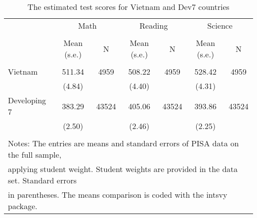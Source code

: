 \documentclass[10pt]{article}
\begin{document}
	\begin{table}[htbp]
		\footnotesize
		\def\arraystretch{0.9}
		\centering
		\caption{The estimated test scores for Vietnam and Dev7 countries}
		\begin{tabular}{lcccccc}
    \toprule
    \midrule
          & \multicolumn{2}{c}{Math} & \multicolumn{2}{c}{Reading} & \multicolumn{2}{c}{Science} \\ \cline{2-7} \\
          & Mean (s.e.) & N     & Mean (s.e.) & N     & Mean (s.e.) & N \\
          \hline \\
    Vietnam & 511.34 & 4959  & 508.22 & 4959  & 528.42 & 4959 \\
          & (4.84) &       & (4.40) &       & (4.31) &  \\
    Developing 7 & 383.29 & 43524 & 405.06 & 43524 & 393.86 & 43524 \\
          & (2.50) &       & (2.46) &       & (2.25) &  \\
         \hline \\
         \multicolumn{7}{l}{Notes: The entries are means and standard errors of PISA data on the full sample,} \\
        \multicolumn{7}{l}{applying student weight. Student weights are provided in the data set. Standard errors}\\
         \multicolumn{7}{l}{in parentheses. The means comparison is coded with the intsvy package.} \\
      
    \end{tabular}%
  \label{tab:addlabel}%
\end{table}%
\end{document}
